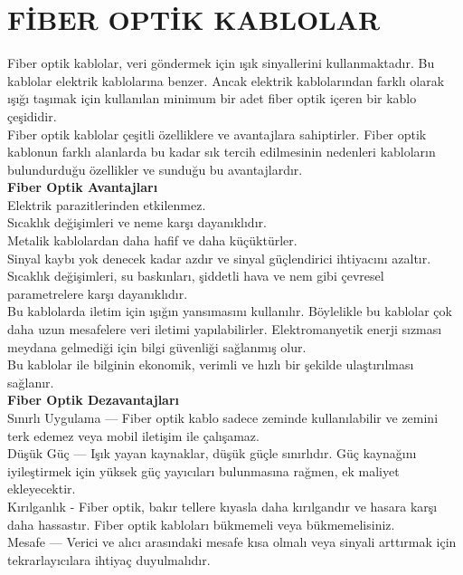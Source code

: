 \section*{FİBER OPTİK KABLOLAR}
Fiber optik kablolar, veri göndermek için ışık sinyallerini kullanmaktadır. Bu kablolar elektrik kablolarına benzer. Ancak elektrik kablolarından farklı olarak ışığı taşımak için kullanılan minimum bir adet fiber optik içeren bir kablo çeşididir.\\
Fiber optik kablolar çeşitli özelliklere ve avantajlara sahiptirler. Fiber optik kablonun farklı alanlarda  bu kadar sık tercih edilmesinin nedenleri kabloların bulundurduğu özellikler ve sunduğu bu avantajlardır. \\
\textbf{Fiber Optik Avantajları}\\
Elektrik parazitlerinden etkilenmez.\\
Sıcaklık değişimleri ve neme karşı dayanıklıdır.\\
Metalik kablolardan daha hafif ve daha küçüktürler.\\
Sinyal kaybı yok denecek kadar azdır ve sinyal güçlendirici ihtiyacını azaltır.\\
Sıcaklık değişimleri, su baskınları, şiddetli hava ve nem gibi çevresel parametrelere karşı dayanıklıdır.\\
Bu kablolarda iletim için ışığın yansımasını kullanılır. Böylelikle bu kablolar çok daha uzun mesafelere veri iletimi yapılabilirler.
Elektromanyetik enerji sızması meydana gelmediği için bilgi güvenliği sağlanmış olur.\\
Bu kablolar ile bilginin ekonomik, verimli ve hızlı bir şekilde ulaştırılması sağlanır.\\
\textbf{Fiber Optik Dezavantajları}\\
Sınırlı Uygulama — Fiber optik kablo sadece zeminde kullanılabilir ve zemini terk edemez veya mobil iletişim ile çalışamaz.\\
Düşük Güç — Işık yayan kaynaklar, düşük güçle sınırlıdır. Güç kaynağını iyileştirmek için yüksek güç yayıcıları bulunmasına rağmen, ek maliyet ekleyecektir.\\
Kırılganlık - Fiber optik, bakır tellere kıyasla daha kırılgandır ve hasara karşı daha hassastır. Fiber optik kabloları bükmemeli veya bükmemelisiniz.\\
Mesafe — Verici ve alıcı arasındaki mesafe kısa olmalı veya sinyali arttırmak için tekrarlayıcılara ihtiyaç duyulmalıdır.\\

